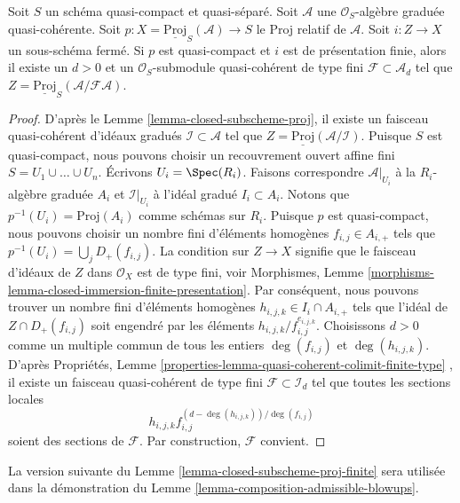 \begin{lemma}
\label{lemma-closed-subscheme-proj-finite}
Soit  $S$  un schéma quasi-compact et quasi-séparé. Soit  $\mathcal{A}$  une
 $\mathcal{O}_S$-algèbre graduée quasi-cohérente. Soit  $p : X = \underline{\text{Proj}}_S(\mathcal{A}) \to S$  le Proj relatif de
 $\mathcal{A}$. Soit  $i : Z \to X$  un sous-schéma fermé. Si  $p$  est
quasi-compact et  $i$  est de présentation finie, alors il existe un
 $d > 0$  et un  $\mathcal{O}_S$-submodule quasi-cohérent de type fini  $\mathcal{F} \subset \mathcal{A}_d$ 
tel que  $Z = \underline{\text{Proj}}_S(\mathcal{A}/\mathcal{F}\mathcal{A})$.
\end{lemma}

\begin{proof}
D'après le Lemme \ref{lemma-closed-subscheme-proj}, il existe un faisceau quasi-cohérent
d'idéaux gradués $\mathcal{I} \subset \mathcal{A}$ tel que $Z = \underline{\text{Proj}}(\mathcal{A}/\mathcal{I})$. Puisque  $S$ est
quasi-compact, nous pouvons choisir un recouvrement ouvert affine
fini $S = U_1 \cup \ldots \cup U_n$. Écrivons  $U_i = \Spec(R_i)$. Faisons correspondre  $\mathcal{A}|_{U_i}$ à
la $R_i$-algèbre graduée $A_i$ et  $\mathcal{I}|_{U_i}$ à l'idéal
gradué $I_i \subset A_i$. Notons que  $p^{-1}(U_i) = \text{Proj}(A_i)$ comme schémas sur $R_i$. Puisque
 $p$ est quasi-compact, nous pouvons choisir un nombre fini d'éléments
homogènes $f_{i, j} \in A_{i, +}$ tels que $p^{-1}(U_i) = \bigcup_j D_{+}(f_{i, j})$. La condition sur  $Z \to X$  signifie
que le faisceau d'idéaux de  $Z$  dans  $\mathcal{O}_X$  est de type fini, voir
Morphismes, Lemme  \ref{morphisms-lemma-closed-immersion-finite-presentation}. Par conséquent, nous pouvons trouver un nombre
fini d'éléments homogènes  $h_{i, j, k} \in I_i \cap A_{i, +}$  tels que l'idéal de  $Z \cap D_{+}(f_{i, j})$  soit
engendré par les éléments  $h_{i, j, k}/f_{i, j}^{e_{i, j, k}}$. Choisissons  $d > 0$  comme un multiple
commun de tous les entiers  $\deg(f_{i, j})$  et  $\deg(h_{i, j, k})$. D'après Propriétés, Lemme
 \ref{properties-lemma-quasi-coherent-colimit-finite-type} , il existe un faisceau quasi-cohérent de type fini  $\mathcal{F} \subset \mathcal{I}_d$  tel
que toutes les sections locales
$$
h_{i, j, k}f_{i, j}^{(d - \deg(h_{i, j, k}))/\deg(f_{i, j})}
$$
soient des sections de  $\mathcal{F}$. Par construction,  $\mathcal{F}$  convient.
\end{proof}

\noindent
La version suivante du Lemme  \ref{lemma-closed-subscheme-proj-finite}  sera utilisée dans la démonstration du
Lemme  \ref{lemma-composition-admissible-blowups}.

